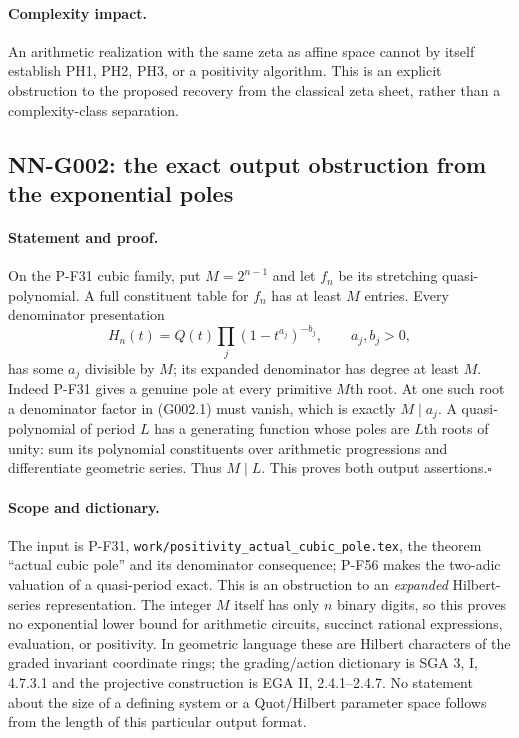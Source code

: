\paragraph{Complexity impact.}
An arithmetic realization with the same zeta as affine space cannot
by itself establish PH1, PH2, PH3, or a positivity algorithm. This is
an explicit obstruction to the proposed recovery from the classical
zeta sheet, rather than a complexity-class separation.

\subsection{NN-G002: the exact output obstruction from the exponential poles}
\paragraph{Statement and proof.}
On the P-F31 cubic family, put $M=2^{n-1}$ and let $f_n$ be its
stretching quasi-polynomial. A full constituent table for $f_n$ has
at least $M$ entries. Every denominator presentation
\[
 H_n(t)=Q(t)\prod_j(1-t^{a_j})^{-b_j},\qquad a_j,b_j>0,
 \tag{G002.1}
\]
has some $a_j$ divisible by $M$; its expanded denominator has degree
at least $M$. Indeed P-F31 gives a genuine pole at every primitive
$M$th root. At one such root a denominator factor in (G002.1) must
vanish, which is exactly $M\mid a_j$. A quasi-polynomial of period
$L$ has a generating function whose poles are $L$th roots of unity:
sum its polynomial constituents over arithmetic progressions and
differentiate geometric series. Thus $M\mid L$. This proves both
output assertions.\hfill$\square$

\paragraph{Scope and dictionary.}
The input is P-F31, \texttt{work/positivity\_actual\_cubic\_pole.tex},
the theorem ``actual cubic pole'' and its denominator consequence;
P-F56 makes the two-adic valuation of a quasi-period exact. This is
an obstruction to an \emph{expanded} Hilbert-series representation.
The integer $M$ itself has only $n$ binary digits, so this proves no
exponential lower bound for arithmetic circuits, succinct rational
expressions, evaluation, or positivity. In geometric language these
are Hilbert characters of the graded invariant coordinate rings;
the grading/action dictionary is SGA 3, I, 4.7.3.1 and the projective
construction is EGA II, 2.4.1--2.4.7. No statement about the size of
a defining system or a Quot/Hilbert parameter space follows from
the length of this particular output format.

